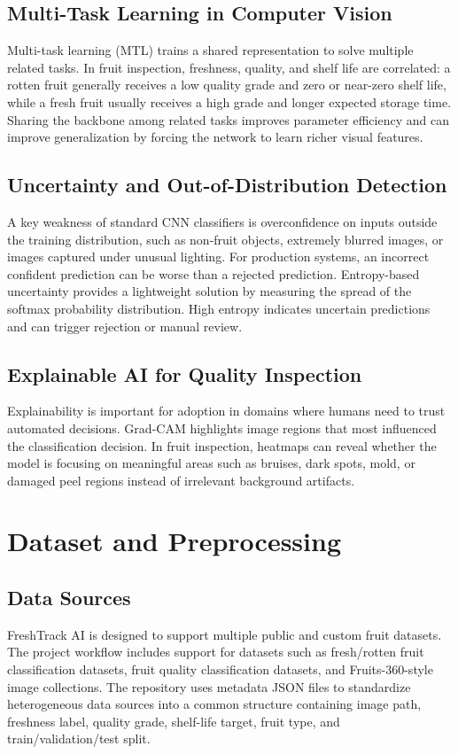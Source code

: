 \documentclass[conference]{IEEEtran}
\begin{document}
\subsection{Multi-Task Learning in Computer Vision}
Multi-task learning (MTL) trains a shared representation to solve multiple related tasks. In fruit inspection, freshness, quality, and shelf life are correlated: a rotten fruit generally receives a low quality grade and zero or near-zero shelf life, while a fresh fruit usually receives a high grade and longer expected storage time. Sharing the backbone among related tasks improves parameter efficiency and can improve generalization by forcing the network to learn richer visual features.

\subsection{Uncertainty and Out-of-Distribution Detection}
A key weakness of standard CNN classifiers is overconfidence on inputs outside the training distribution, such as non-fruit objects, extremely blurred images, or images captured under unusual lighting. For production systems, an incorrect confident prediction can be worse than a rejected prediction. Entropy-based uncertainty provides a lightweight solution by measuring the spread of the softmax probability distribution. High entropy indicates uncertain predictions and can trigger rejection or manual review.

\subsection{Explainable AI for Quality Inspection}
Explainability is important for adoption in domains where humans need to trust automated decisions. Grad-CAM highlights image regions that most influenced the classification decision. In fruit inspection, heatmaps can reveal whether the model is focusing on meaningful areas such as bruises, dark spots, mold, or damaged peel regions instead of irrelevant background artifacts.

\section{Dataset and Preprocessing}
\subsection{Data Sources}
FreshTrack AI is designed to support multiple public and custom fruit datasets. The project workflow includes support for datasets such as fresh/rotten fruit classification datasets, fruit quality classification datasets, and Fruits-360-style image collections. The repository uses metadata JSON files to standardize heterogeneous data sources into a common structure containing image path, freshness label, quality grade, shelf-life target, fruit type, and train/validation/test split.
\end{document}
